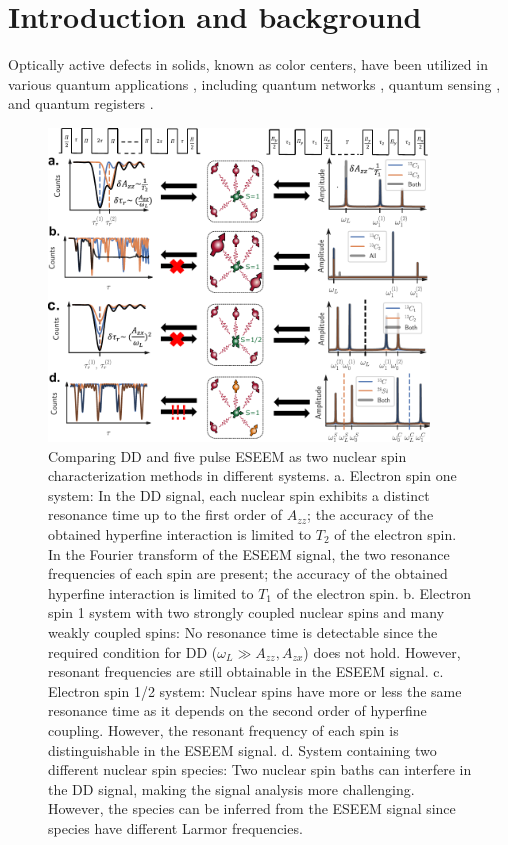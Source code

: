 \documentclass[%
 reprint,
superscriptaddress,
 amsmath,amssymb,
 aps,
]{revtex4-2}
\begin{document}
\maketitle
\section{Introduction and background}
Optically active defects in solids, known as color centers, have been utilized in various quantum applications \cite{awschalom2018quantum}, including quantum networks \cite{pompili2021realization}, quantum sensing \cite{degen2017quantum}, and quantum registers \cite{bradley2019ten}. 

\begin{figure}%
	\begin{center}
		\includegraphics[width=0.9\textwidth]{pict/drawing0.pdf}
		\caption{Comparing DD and five pulse ESEEM as two nuclear spin characterization methods in different systems. a. Electron spin one system: In the DD signal, each nuclear spin exhibits a distinct resonance time up to the first order of $A_{zz}$; the accuracy of the obtained hyperfine interaction is limited to $T_2$ of the electron spin. In the Fourier transform of the ESEEM signal, the two resonance frequencies of each spin are present; the accuracy of the obtained hyperfine interaction is limited to $T_1$ of the electron spin. b. Electron spin 1 system with two strongly coupled nuclear spins and many weakly coupled spins: No resonance time is detectable since the required condition for DD ($\omega_L \gg A_{zz}, A_{zx}$) does not hold. However, resonant frequencies are still obtainable in the ESEEM signal. c. Electron spin 1/2 system: Nuclear spins have more or less the same resonance time as it depends on the second order of hyperfine coupling. However, the resonant frequency of each spin is distinguishable in the ESEEM signal. d. System containing two different nuclear spin species: Two nuclear spin baths can interfere in the DD signal, making the signal analysis more challenging. However, the species can be inferred from the ESEEM signal since species have different Larmor frequencies.}

\end{center}
\end{figure}
\end{document}
